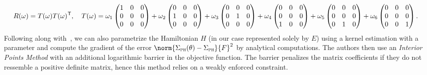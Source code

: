 \begin{equation}\label{eq:spsd-basis-decomposition}
    R(\omega) = T(\omega) T(\omega)^{\mkern1mu \mathsf{T}},\quad T(\omega) = \omega_1 \begin{pmatrix}
        1 & 0 & 0 \\
        0 & 0 & 0 \\
        0 & 0 & 0
    \end{pmatrix} + \omega_2 \begin{pmatrix}
        0 & 0 & 0 \\
        1 & 0 & 0 \\
        0 & 0 & 0
    \end{pmatrix} + \omega_3 \begin{pmatrix}
        0 & 0 & 0 \\
        0 & 1 & 0 \\
        0 & 0 & 0
    \end{pmatrix} + \omega_4 \begin{pmatrix}
        0 & 0 & 0 \\
        0 & 0 & 0 \\
        1 & 0 & 0
    \end{pmatrix} + \omega_5 \begin{pmatrix}
        0 & 0 & 0 \\
        0 & 0 & 0 \\
        0 & 1 & 0
    \end{pmatrix} + \omega_6 \begin{pmatrix}
        0 & 0 & 0 \\
        0 & 0 & 0 \\
        0 & 0 & 1
    \end{pmatrix}.
\end{equation}
Following along with~\cite{Najnudel2021}, we can also parametrize the Hamiltonian $H$ (in our case represented solely by $E$) using a kernel estimation with a parameter and compute the gradient of the error $\norm{\Sigma_\msc{ph}(\theta) - \Sigma_\msc{ph}}{F}^2$ by analytical computations.
The authors then use an \emph{Interior Points Method} with an additional logarithmic barrier in the objective function.
The barrier penalizes the matrix coefficients if they do not ressemble a positive definite matrix, hence this method relies on a weakly enforced constraint.


